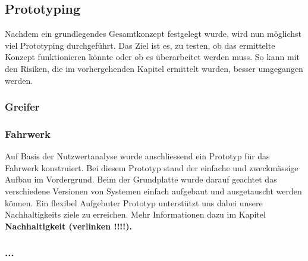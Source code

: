 \subsection{Prototyping}

Nachdem ein grundlegendes Gesamtkonzept festgelegt wurde, wird nun möglichst viel Prototyping durchgeführt. Das Ziel ist es, zu testen, ob das ermittelte Konzept funktionieren könnte oder ob es überarbeitet werden muss. So kann mit den Risiken, die im vorhergehenden Kapitel ermittelt wurden, besser umgegangen werden.

\subsubsection{Greifer}


\subsubsection{Fahrwerk}

Auf Basis der Nutzwertanalyse wurde anschliessend ein Prototyp für das Fahrwerk konstruiert. Bei diesem Prototyp stand der einfache und zweckmässige Aufbau im Vordergrund. Beim der Grundplatte wurde darauf geachtet das verschiedene  Versionen von Systemen einfach aufgebaut und ausgetauscht werden können. Ein flexibel Aufgebuter Prototyp unterstützt uns dabei unsere Nachhaltigkeits ziele zu erreichen. Mehr Informationen dazu im Kapitel \textbf{Nachhaltigkeit (verlinken !!!!).} 

\subsubsection{...}

